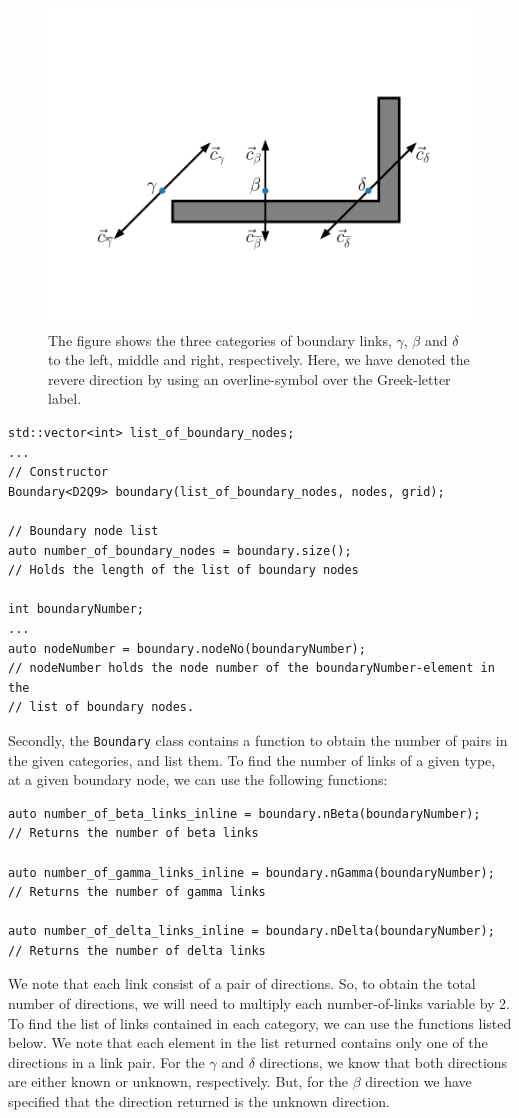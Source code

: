 \documentclass[11pt,a4paper]{report}
\begin{document}
\begin{figure}[h]
	\centering
	\includegraphics[width=0.7\linewidth]{Figures/laplace_boundary_condition.pdf}
	\caption{The figure shows the three categories of boundary links, $\gamma$, $\beta$ and $\delta$ to the left, middle and right, respectively. Here, we have denoted the revere direction by using an overline-symbol over the Greek-letter label.}
	\label{fig:boundary distribtuion categoris}
\end{figure}
\begin{verbatim}
std::vector<int> list_of_boundary_nodes;
...
// Constructor
Boundary<D2Q9> boundary(list_of_boundary_nodes, nodes, grid);

// Boundary node list
auto number_of_boundary_nodes = boundary.size();
// Holds the length of the list of boundary nodes

int boundaryNumber; 
...
auto nodeNumber = boundary.nodeNo(boundaryNumber);
// nodeNumber holds the node number of the boundaryNumber-element in the 
// list of boundary nodes.
\end{verbatim}
Secondly, the \texttt{Boundary} class contains a function to obtain the number of pairs in the given categories, and list them. To find the number of links of a given type, at a given boundary node, we can use the following functions:
\begin{verbatim}
auto number_of_beta_links_inline = boundary.nBeta(boundaryNumber);
// Returns the number of beta links

auto number_of_gamma_links_inline = boundary.nGamma(boundaryNumber);
// Returns the number of gamma links

auto number_of_delta_links_inline = boundary.nDelta(boundaryNumber);
// Returns the number of delta links
\end{verbatim}
We note that each link consist of a pair of directions. So, to obtain the total number of directions, we will need to multiply each number-of-links variable by 2. To find the list of links contained in each category, we can use the functions listed below. We note that each element in the list returned contains only one of the directions in a link pair. For the $\gamma$ and $\delta$ directions, we know that both directions are either known or unknown, respectively. But, for the $\beta$ direction we have specified that the direction returned is the unknown direction.
\end{document}
